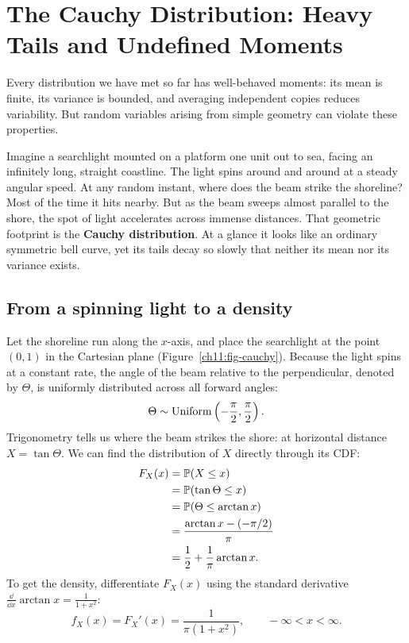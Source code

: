 \section{The Cauchy Distribution: Heavy Tails and Undefined Moments}
\label{ch11:cauchy}

\begin{intuitionbox}
Every distribution we have met so far has well-behaved moments: its mean is
finite, its variance is bounded, and averaging independent copies reduces
variability. But random variables arising from simple geometry can violate these
properties.

Imagine a searchlight mounted on a platform one unit out to sea, facing an
infinitely long, straight coastline. The light spins around and around at a steady
angular speed. At any random instant, where does the beam strike the shoreline?
Most of the time it hits nearby. But as the beam sweeps almost parallel to the
shore, the spot of light accelerates across immense distances. That geometric
footprint is the \textbf{Cauchy distribution}. At a glance it looks like an
ordinary symmetric bell curve, yet its tails decay so slowly that neither its
mean nor its variance exists.
\end{intuitionbox}

\subsection{From a spinning light to a density}

Let the shoreline run along the $x$-axis, and place the searchlight at the point
$(0,1)$ in the Cartesian plane (Figure~\ref{ch11:fig-cauchy}). Because the light
spins at a constant rate, the angle of the beam relative to the perpendicular,
denoted by $\Theta$, is uniformly distributed across all forward angles:
\[
  \Theta \sim \Unif\left(-\frac{\pi}{2}, \frac{\pi}{2}\right).
\]
Trigonometry tells us where the beam strikes the shore: at horizontal distance
$X = \tan \Theta$. We can find the distribution of $X$ directly through its CDF:
\begin{align*}
  F_X(x) &= \P(X \le x) \\
         &= \P(\tan \Theta \le x) \\
         &= \P(\Theta \le \arctan x) \\
         &= \frac{\arctan x - (-\pi/2)}{\pi} \\
         &= \frac{1}{2} + \frac{1}{\pi}\arctan x.
\end{align*}
To get the density, differentiate $F_X(x)$ using the standard derivative
$\frac{\dd}{\dd x}\arctan x = \frac{1}{1+x^2}$:
\[
  f_X(x) = F_X'(x) = \frac{1}{\pi(1+x^2)}, \qquad -\infty < x < \infty.
\]

